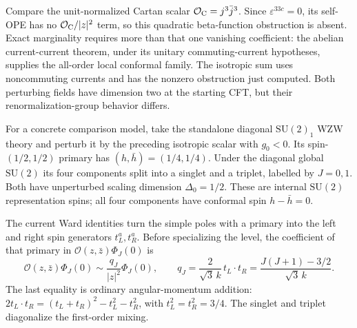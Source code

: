 \begin{example}
Compare the unit-normalized Cartan scalar
$\mathcal O_{\rm C}=j^3\bar j^3$. Since
$\varepsilon^{33c}=0$, its self-OPE has no
$\mathcal O_{\rm C}/|z|^2$ term, so this quadratic beta-function
obstruction is absent. Exact marginality requires more than that
one vanishing coefficient: the abelian current-current theorem,
under its unitary commuting-current hypotheses, supplies the
all-order local conformal family. The isotropic sum uses
noncommuting currents and has the nonzero obstruction just
computed. Both perturbing fields have dimension two at the
starting CFT, but their renormalization-group behavior differs.
\end{example}

\begin{example}
\label{ex:full-current-logarithms}
For a concrete comparison model, take the standalone diagonal
$\mathrm{SU}(2)_1$ WZW theory and perturb it by the preceding
isotropic scalar with $g_0<0$. Its spin-$(1/2,1/2)$ primary has
$(h,\bar h)=(1/4,1/4)$. Under the diagonal global
$\mathrm{SU}(2)$ its four components split into a singlet and
a triplet, labelled by $J=0,1$. Both have unperturbed scaling
dimension $\Delta_0=1/2$.
These are internal $\mathrm{SU}(2)$ representation spins;
all four components have conformal spin $h-\bar h=0$.

The current Ward identities turn the simple poles with a primary
into the left and right spin generators $t_L^a,t_R^a$.
Before specializing the level, the coefficient of that primary
in $\mathcal O(z,\bar z)\Phi_J(0)$ is
\[
 \mathcal O(z,\bar z)\Phi_J(0)
 \sim\frac{q_J}{|z|^2}\Phi_J(0),\qquad
 q_J=\frac{2}{\sqrt3\,k}\,t_L\cdot t_R
     =\frac{J(J+1)-3/2}{\sqrt3\,k}.
\]
The last equality is ordinary angular-momentum addition:
$2t_L\cdot t_R=(t_L+t_R)^2-t_L^2-t_R^2$, with
$t_L^2=t_R^2=3/4$. The singlet and triplet diagonalize the
first-order mixing.


\end{example}
